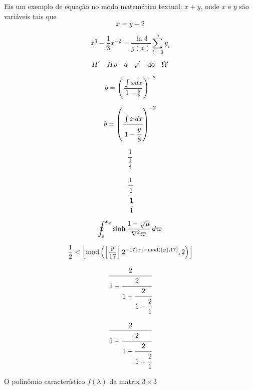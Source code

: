 \documentclass[11pt]{article}
\begin{document}
Eis um exemplo de equação no modo matemático textual: $x+y$, onde $x$ e $y$
são variáveis tais que 
\begin{equation}
    x = y - 2
\end{equation}

\[
    x^3 - \frac{1}{3} x^{-2} = \frac{\ln 4}{g(x)} \sum^n_{i=0} y_i
\]


\begin{equation*}
    H^\prime \quad H\rho \quad a\quad \rho^\prime\quad \textnormal{do} \quad \Omega^\prime
\end{equation*}

\begin{equation*}
b = (\frac{\int x dx}{1-\frac{y}{8}})^{-2}
\end{equation*}

\begin{equation*}
b = \left( \cfrac{\int x\, dx}{1-\cfrac{y}{8}} \right)^{-2}
\end{equation*}


\begin{equation*}
\frac{1}{\frac{1}{\frac{1}{1}}}
\end{equation*}

\begin{equation*}
\cfrac{1}{\cfrac{1}{\cfrac{1}{1}}}
\end{equation*}

\begin{equation*}
    \oint_{\textsf{\textit{a}}}^{x_\phi} \sinh \frac{1 - \sqrt{\mu}}{\nabla^2\varpi} \, \textsf{\textit{d}}\varpi
\end{equation*}

\begin{equation*}
    \frac{1}{2} < \left\lfloor \textnormal{mod} \left( \left\lfloor \frac{y}{17} \right\rfloor 2^{-17\left\lfloor x \right\rfloor - \textnormal{mod}\left( \left\lfloor y \right \rfloor ,  17 \right)}, 2 \right) \right\rfloor
\end{equation*}


\begin{equation*}
\cfrac{2}{1 + \cfrac{2}{1 + \cfrac{2}{1 + \cfrac{2}{1}}}}
\end{equation*}


\begin{equation*}
\cfrac{2}{1 + \cfrac{2}{1 + \cfrac{2}{1 + \cfrac{2}{1}}}}
\end{equation*}


O polinômio característico $f(\lambda)$
da matrix $3 \times 3$
\end{document}
